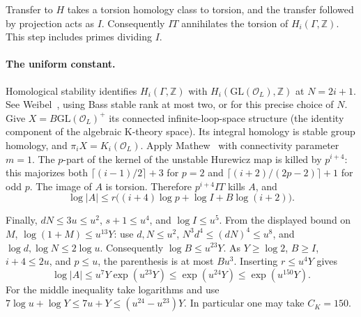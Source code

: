 Transfer to $H$ takes a torsion homology class to torsion, and the transfer followed by projection acts as $I$. Consequently $IT$ annihilates the torsion of $H_i(\Gamma,\mathbb Z)$. This step includes primes dividing $I$.

\paragraph{The uniform constant.}

Homological stability identifies $H_i(\Gamma,\mathbb Z)$ with $H_i(\mathrm{GL}(\mathcal O_L),\mathbb Z)$ at $N=2i+1$. See Weibel~\cite[IV.1.14.1]{weibelBook}, using Bass stable rank at most two, or \cite[\S3.1]{badCells} for this precise choice of $N$. Give $X=B\mathrm{GL}(\mathcal O_L)^+$ its connected infinite-loop-space structure (the identity component of the algebraic K-theory space). Its integral homology is stable group homology, and $\pi_iX=K_i(\mathcal O_L)$. Apply Mathew~\cite[Thm.~6.3]{badMathew} with connectivity parameter $m=1$. The $p$-part of the kernel of the unstable Hurewicz map is killed by $p^{i+4}$: this majorizes both $\lceil(i-1)/2\rceil+3$ for $p=2$ and $\lceil(i+2)/(2p-2)\rceil+1$ for odd $p$. The image of $A$ is torsion. Therefore $p^{i+4}IT$ kills $A$, and
\[\log |A|\le r\big((i+4)\log p+\log I+B\log(i+2)\big).\]

Finally, $dN\le3u\le u^2$, $s+1\le u^4$, and $\log I\le u^5$. From the displayed bound on $M$, $\log(1+M)\le u^{13}Y$: use $d,N\le u^2$, $N^3d^4\le(dN)^4\le u^8$, and $\log d,\log N\le2\log u$. Consequently $\log B\le u^{23}Y$. As $Y\ge\log2$, $B\ge I$, $i+4\le 2u$, and $p\le u$, the parenthesis is at most $B u^3$. Inserting $r\le u^4Y$ gives
\[\log |A|\le u^7Y\exp(u^{23}Y)\le\exp(u^{24}Y)\le\exp(u^{150}Y).\]
For the middle inequality take logarithms and use $7\log u+\log Y\le 7u+Y\le (u^{24}-u^{23})Y$. In particular one may take $C_K=150$.
